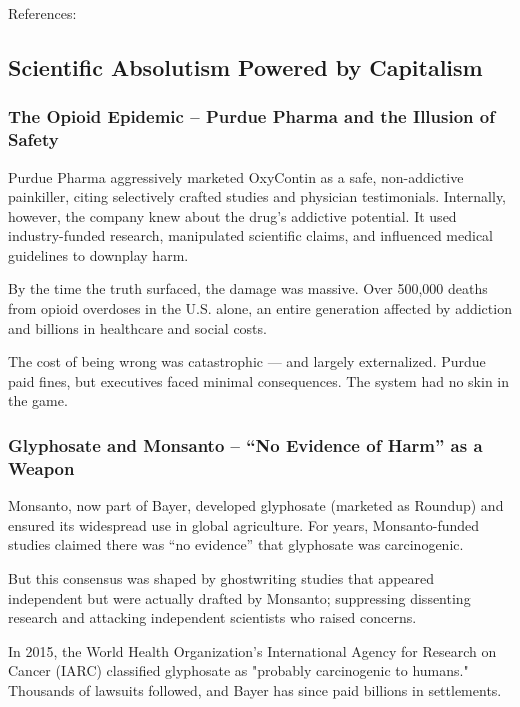References: \cite{Fitzpatrick2006}

\subsection{Scientific Absolutism Powered by Capitalism}

\subsubsection{The Opioid Epidemic – Purdue Pharma and the Illusion of Safety}

Purdue Pharma aggressively marketed OxyContin as a safe, non-addictive painkiller, citing selectively crafted studies and physician testimonials. Internally, however, the company knew about the drug's addictive potential. It used industry-funded research, manipulated scientific claims, and influenced medical guidelines to downplay harm.

By the time the truth surfaced, the damage was massive. Over 500,000 deaths from opioid overdoses in the U.S. alone, an entire generation affected by addiction and billions in healthcare and social costs.

The cost of being wrong was catastrophic — and largely externalized. Purdue paid fines, but executives faced minimal consequences. The system had no skin in the game.

\cite{CBSnewsPurduePharma}
\cite{PBSPurduePharma}
\cite{Alonso2021}

\subsubsection{Glyphosate and Monsanto – “No Evidence of Harm” as a Weapon}

Monsanto, now part of Bayer, developed glyphosate (marketed as Roundup) and ensured its widespread use in global agriculture. For years, Monsanto-funded studies claimed there was “no evidence” that glyphosate was carcinogenic.

But this consensus was shaped by ghostwriting studies that appeared independent but were actually drafted by Monsanto; suppressing dissenting research and attacking independent scientists who raised concerns.

In 2015, the World Health Organization’s International Agency for Research on Cancer (IARC) classified glyphosate as "probably carcinogenic to humans." Thousands of lawsuits followed, and Bayer has since 
paid billions in settlements.

